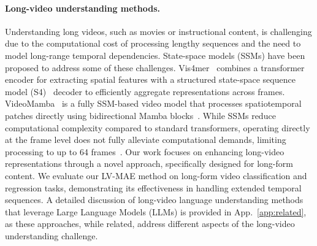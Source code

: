 \vspace{-5mm}
\paragraph{Long-video understanding methods.} Understanding long videos, such as movies or instructional content, is challenging due to the computational cost of processing lengthy sequences and the need to model long-range temporal dependencies. State-space models (SSMs) have been proposed to address some of these challenges. Vis4mer~\cite{islam2022long} combines a transformer encoder for extracting spatial features with a structured state-space sequence model (S4)~\cite{gu2022efficiently} decoder to efficiently aggregate representations across frames. VideoMamba~\cite{li2024videomamba} is a fully SSM-based video model that processes spatiotemporal patches directly using bidirectional Mamba blocks~\cite{Zhu2024VisionME}. While SSMs reduce computational complexity compared to standard transformers, operating directly at the frame level does not fully alleviate computational demands, limiting processing to up to 64 frames~\cite{islam2022long, li2024videomamba}. Our work focuses on enhancing long-video representations through a novel approach, specifically designed for long-form content. We evaluate our LV-MAE method on long-form video classification and regression tasks, demonstrating its effectiveness in handling extended temporal sequences. A detailed discussion of long-video language understanding methods that leverage Large Language Models (LLMs) is provided in App.~\ref{app:related}, as these approaches, while related, address different aspects of the long-video understanding challenge.
